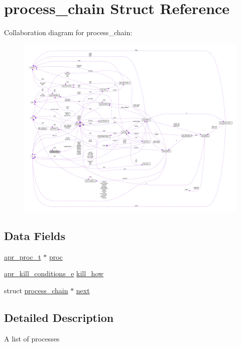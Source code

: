 \hypertarget{structprocess__chain}{}\section{process\+\_\+chain Struct Reference}
\label{structprocess__chain}


Collaboration diagram for process\+\_\+chain\+:
\nopagebreak
\begin{figure}[H]
\begin{center}
\leavevmode
\includegraphics[width=350pt]{structprocess__chain__coll__graph}
\end{center}
\end{figure}
\subsection*{Data Fields}
\begin{DoxyCompactItemize}
\item 
\hyperlink{structapr__proc__t}{apr\+\_\+proc\+\_\+t} $\ast$ \hyperlink{structprocess__chain_af0ad556e0fb0ea76de33ce6734dad6c3}{proc}
\item 
\hyperlink{group__apr__thread__proc_ga3eaec78633742e7e0cb9480a21477aff}{apr\+\_\+kill\+\_\+conditions\+\_\+e} \hyperlink{structprocess__chain_a317362693ef206fbaa8d716f6ca95947}{kill\+\_\+how}
\item 
struct \hyperlink{structprocess__chain}{process\+\_\+chain} $\ast$ \hyperlink{structprocess__chain_afa4b764a6d2c8e02d6be043738161ee6}{next}
\end{DoxyCompactItemize}


\subsection{Detailed Description}
A list of processes 


